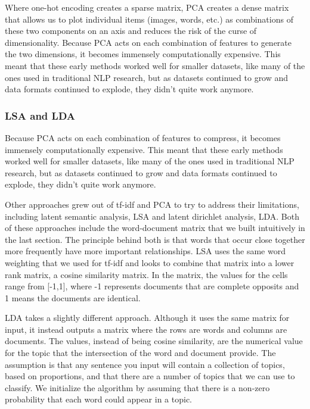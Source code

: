 \documentclass[11pt]{diazessay} %
\begin{document}
Where one-hot encoding creates a sparse matrix, PCA creates a dense matrix that  allows us to plot individual items (images, words, etc.) as combinations of these two components on an axis and reduces the risk of the curse of dimensionality. Because PCA acts on each combination of features to generate the two dimensions, it becomes immensely computationally expensive.  This meant that these early methods worked well for smaller datasets, like many of the ones used in traditional NLP research,  but as datasets continued to grow and data formats continued to explode, they didn’t quite work anymore. 


\subsubsection{LSA and LDA}
Because PCA acts on each combination of features to compress, it becomes immensely computationally expensive.  This meant that these early methods worked well for smaller datasets, like many of the ones used in traditional NLP research,  but as datasets continued to grow and data formats continued to explode, they didn’t quite work anymore.   

Other approaches grew out of tf-idf and PCA to try to address their limitations, including latent semantic analysis, LSA and latent dirichlet analysis, LDA\cite{cvitanic2016lda}.  Both of these approaches include the word-document matrix that we built intuitively in the last section. The principle behind both is that words that occur close together more frequently have more important relationships.  LSA uses the same word weighting that we used for tf-idf and looks to combine that matrix into a lower rank matrix, a cosine similarity matrix. In the matrix, the values for the cells range from [-1,1], where -1 represents documents that are complete opposits and 1 means the documents are identical. 

LDA takes a slightly different approach. Although it uses the same matrix for input, it instead outputs a matrix where the rows are words and columns are documents. The values, instead of being cosine similarity, are the numerical value for the topic that the intersection of the word and document provide.  The assumption is that any sentence you input will contain a collection of topics, based on proportions, and that there are a number of topics that we can use to classify. We initialize the algorithm by assuming that there is a non-zero probability that each word could appear in a topic. 
\end{document}
